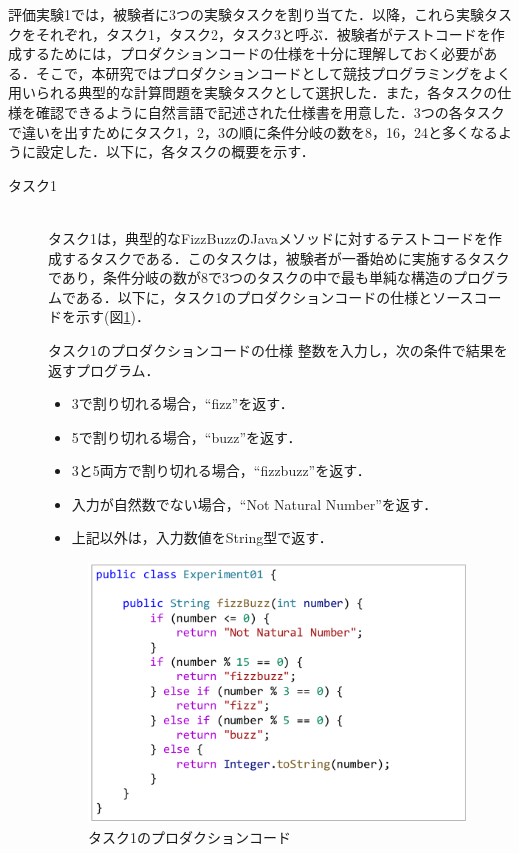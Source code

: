 \documentclass[12pt]{jarticle} %
\begin{document}
評価実験1では，被験者に3つの実験タスクを割り当てた．以降，これら実験タスクをそれぞれ，タスク1，タスク2，タスク3と呼ぶ．被験者がテストコードを作成するためには，プロダクションコードの仕様を十分に理解しておく必要がある．そこで，本研究ではプロダクションコードとして競技プログラミングをよく用いられる典型的な計算問題を実験タスクとして選択した．また，各タスクの仕様を確認できるように自然言語で記述された仕様書を用意した．3つの各タスクで違いを出すためにタスク1，2，3の順に条件分岐の数を8，16，24と多くなるように設定した．以下に，各タスクの概要を示す．

\begin{description}
\item[タスク1]~\\
タスク1は，典型的なFizzBuzzのJavaメソッドに対するテストコードを作成するタスクである．このタスクは，被験者が一番始めに実施するタスクであり，条件分岐の数が8で3つのタスクの中で最も単純な構造のプログラムである．以下に，タスク1のプロダクションコードの仕様とソースコードを示す(図\ref{E1})．

\begin{itembox}[l]{タスク1のプロダクションコードの仕様}
整数を入力し，次の条件で結果を返すプログラム．
\begin{itemize}
\item 3で割り切れる場合，``fizz''を返す．
\item 5で割り切れる場合，``buzz''を返す．
\item 3と5両方で割り切れる場合，``fizzbuzz''を返す．
\item 入力が自然数でない場合，``Not Natural Number''を返す．
\item 上記以外は，入力数値をString型で返す．
\end{itemize}
\end{itembox}

\begin{figure}[htbp]
\begin{center}
\includegraphics[clip,width=10cm]{E1.pdf}
\caption{タスク1のプロダクションコード}
\label{E1}
\end{center}
\end{figure}


\end{description}
\end{document}
